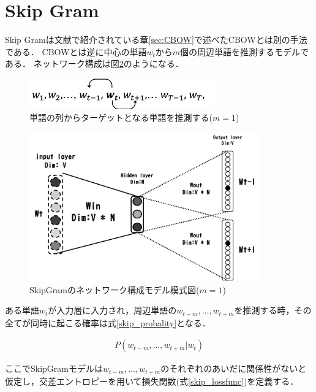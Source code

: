 \documentclass[a4j,11pt,report]{jsbook}
\begin{document}
\clearpage

\section{Skip Gram \label{sec:SkipGram}}
Skip Gramは文献\cite{SkipCBOW}で紹介されている章\ref{sec:CBOW}で述べたCBOWとは別の手法である．
CBOWとは逆に中心の単語$w_{t}$から$m$個の周辺単語を推測するモデルである．
ネットワーク構成は図\ref{fig:SkipGramimage}のようになる．

\begin{figure}
  \centering
  \includegraphics[width = 80mm]{image/skipgram_w1w2wt-1wtwt+1.png}
  \caption{単語の列からターゲットとなる単語を推測する($m = 1$)}
  \label{fig:Skipformula}
\end{figure}


\begin{figure}
  \centering
  \includegraphics[width = 100mm]{image/SkipGram_windowsize_1.png}
  \caption{SkipGramのネットワーク構成モデル模式図($ m = 1$) }
  \label{fig:SkipGramimage}
\end{figure}



ある単語$w_{t}$が入力層に入力され，周辺単語の$w_{t-m},...,w_{t+m}$を推測する時，その全てが同時に起こる確率は式\ref{skip_probality}となる．

\begin{equation}
  \label{skip_probality}
  \begin{array}{c}
    P(w_{t-m},...,w_{t+m}|w_{t})
  \end{array}
\end{equation}

ここでSkipGramモデルは$w_{t-m},...,w_{t+m}$のそれぞれのあいだに関係性がないと仮定し，交差エントロピーを用いて損失関数(式\ref{skip_lossfunc})を定義する．
\end{document}
